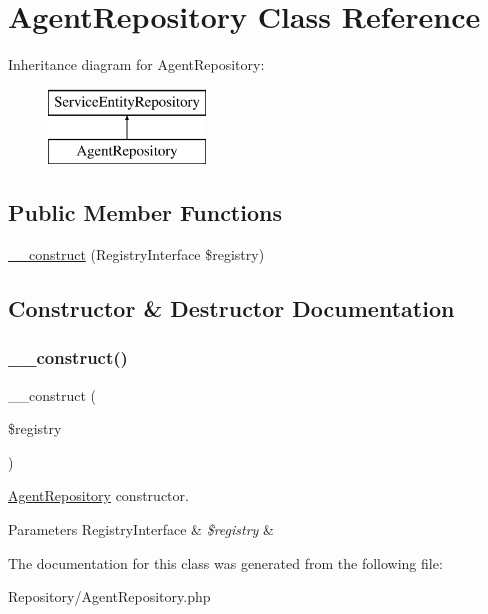 \hypertarget{class_app_1_1_repository_1_1_agent_repository}{}\section{Agent\+Repository Class Reference}
\label{class_app_1_1_repository_1_1_agent_repository}
Inheritance diagram for Agent\+Repository\+:\begin{figure}[H]
\begin{center}
\leavevmode
\includegraphics[height=2.000000cm]{class_app_1_1_repository_1_1_agent_repository}
\end{center}
\end{figure}
\subsection*{Public Member Functions}
\begin{DoxyCompactItemize}
\item 
\mbox{\hyperlink{class_app_1_1_repository_1_1_agent_repository_aadca7edd263e228921a1860bb6b9c252}{\+\_\+\+\_\+construct}} (Registry\+Interface \$registry)
\end{DoxyCompactItemize}


\subsection{Constructor \& Destructor Documentation}
\mbox{\label{class_app_1_1_repository_1_1_agent_repository_aadca7edd263e228921a1860bb6b9c252}} 
\subsubsection{\texorpdfstring{\_\_construct()}{\_\_construct()}}
{\footnotesize\ttfamily \+\_\+\+\_\+construct (\begin{DoxyParamCaption}\item[{Registry\+Interface}]{\$registry }\end{DoxyParamCaption})}

\mbox{\hyperlink{class_app_1_1_repository_1_1_agent_repository}{Agent\+Repository}} constructor. 
\begin{DoxyParams}[1]{Parameters}
Registry\+Interface & {\em \$registry} & \\
\hline
\end{DoxyParams}


The documentation for this class was generated from the following file\+:\begin{DoxyCompactItemize}
\item 
Repository/Agent\+Repository.\+php\end{DoxyCompactItemize}
